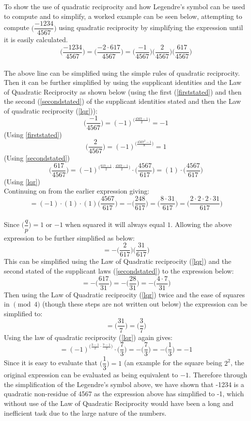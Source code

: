 \documentclass{article}
\begin{document}
To show the use of quadratic reciprocity and how Legendre's symbol can be used to compute and to simplify, a worked example can be seen below, attempting to compute \(\bigg( \dfrac{-1234}{4567} \bigg)\) using quadratic reciprocity by simplifying the expression until it is easily calculated.
\\
\[\bigg( \dfrac{-1234}{4567} \bigg) = \bigg( \dfrac{-2 \cdot 617}{4567} \bigg) = \bigg( \dfrac{-1}{4567} \bigg)\bigg( \dfrac{2}{4567} \bigg) \bigg( \dfrac{617}{4567} \bigg)\] \\
The above line can be simplified using the simple rules of quadratic reciprocity. Then it can be further simplified by using the supplicant identities and the Law of Quadratic Reciprocity as shown below (using the first (\ref{firststated}) and then the second (\ref{secondstated}) of the supplicant identities stated and then the Law of quadratic reciprocity (\ref{lqr})):
\[\bigg( \dfrac{-1}{4567} \bigg) = (-1)^{\bigg(\displaystyle\frac{4567-1}{2}\bigg)} = -1 \] (Using \ref{firststated}) \\
\[\bigg( \dfrac{2}{4567} \bigg) = (-1)^{\bigg(\displaystyle \frac{4567^2 -1}{8}\bigg)} = 1\] (Using \ref{secondstated}) \\
\[\bigg( \dfrac{617}{4567} \bigg) = (-1)^{\bigg(\displaystyle \frac{617-1}{2}\cdot\frac{4567-1}{2}\bigg)} \cdot \bigg( \dfrac{4567}{617} \bigg) = (1) \cdot \bigg( \dfrac{4567}{617} \bigg) \] (Using \ref{lqr})\\
Continuing on from the earlier expression giving:
\[=(-1)\cdot(1)\cdot(1) \bigg( \dfrac{4567}{617} \bigg) = -\bigg( \dfrac{248}{617} \bigg) = \bigg( \dfrac{8 \cdot 31}{617} \bigg) = \bigg( \dfrac{2 \cdot 2 \cdot 2 \cdot 31}{617} \bigg) \]  \\
Since $\bigg( \dfrac{q}{p}\bigg) = 1$ or $-1$ when squared it will always equal $1$. Allowing the above expression to be further simplified as below:
\[ = - \bigg( \dfrac{2}{617} \bigg)\bigg( \dfrac{31}{617} \bigg) \]
This can be simplified using the Law of Quadratic reciprocity (\ref{lqr}) and the second stated of the supplicant laws (\ref{secondstated}) to the expression below:
\[ = - \bigg( \dfrac{617}{31} \bigg) = - \bigg( \dfrac{28}{31} \bigg) = - \bigg( \dfrac{4 \cdot 7}{31} \bigg) \]
Then using the Law of Quadratic reciprocity (\ref{lqr}) twice and the ease of squares in $ \pmod{4}$ (though these steps are not written out below) the expression can be simplified to:
\[= \bigg( \dfrac{31}{7} \bigg) = \bigg( \dfrac{3}{7} \bigg) \]
Using the law of quadratic reciprocity (\ref{lqr}) again gives:
\[ = (-1)^{\bigg(\displaystyle \frac{3-1}{2}\cdot\frac{7-1}{2}\bigg)} \cdot \bigg( \dfrac{7}{3} \bigg) = - \bigg( \dfrac{7}{3} \bigg) = - \bigg( \dfrac{1}{3} \bigg) = -1 \]
Since it is easy to evaluate that $\bigg( \dfrac{1}{3} \bigg) = 1$ (an example for the square being $2^2$, the original expression can be evaluated as being equivalent to $-1$.
Therefore through the simplification of the Legendre's symbol above, we have shown that -1234 is a quadratic non-residue of 4567 as the expression above has simplified to -1, which without use of the Law of Quadratic Reciprocity would have been a long and inefficient task due to the large nature of the numbers.
\end{document}
